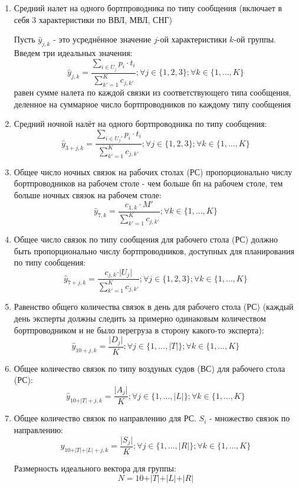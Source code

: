 \documentclass[%
10pt, %
final, %
oneside, %
onecolumn, %
centertags]{article} %
\theoremstyle{plain}
\theoremstyle{definition}
\theoremstyle{remark}
\begin{document}
\begin{enumerate}
	\item Средний налет на одного бортпроводника по типу сообщения (включает в себя $3$ характеристики по ВВЛ, МВЛ, СНГ)

	Пусть $\hat{y}_{j,k}$ - это усреднённое значение $j$-ой характеристики $k$-ой группы. Введем три идеальных значения:
	$$\hat{y}_{j,k} = \frac{\sum\limits_{i \in U_j} p_i \cdot t_i}{\sum\limits_{k'=1}^K c_{j,k'}}; \forall j \in \{1,2,3\}; \forall k \in \{1,\ldots,K\}$$
	равен сумме налета по каждой связки из соответствующего типа сообщения, деленное на суммарное число бортпроводников по каждому типу сообщения 
	\item Средний ночной налёт на одного бортпроводника по типу сообщения:
	$$\hat{y}_{3+j,k} = \frac{\sum\limits_{i \in U_j'} p_i \cdot t_i}{\sum\limits_{k'=1}^K c_{j,k'}}; \forall j \in \{1,2,3\}; \forall k \in \{1,\ldots,K\}$$
	\item Общее число ночных связок на рабочих столах (РС) пропорционально числу бортпроводников на рабочем столе - чем больше бп на рабочем столе, тем больше ночных связок на рабочем столе:
	$$\hat{y}_{7,k} = \frac{c_{1,k}\cdot M'}{\sum\limits_{k'=1}^K c_{j,k'}}; \forall k \in\{1,\ldots,K\}$$
	\item Общее число связок по типу сообщения для рабочего стола (РС) должно быть пропорционально числу бортпроводников, доступных для планирования по типу сообщения:
	$$\hat{y}_{7+j,k} = \frac{c_{j,k}\cdot \vert U_j\vert}{\sum\limits_{k'=1}^K c_{j,k'}}; \forall j \in \{1,2,3\};\forall k \in\{1,\ldots,K\}$$
	\item Равенство общего количества связок в день для рабочего стола (РС) (каждый день эксперты должны следить за примерно одинаковым количеством бортпроводником и не было перегруза в сторону какого-то эксперта):
	$$\hat{y}_{10+j,k} = \frac{\vert D_j \vert}{K}; \forall j \in \{1,\ldots,\vert T \vert\};\forall k \in\{1,\ldots,K\}$$
	\item Общее количество связок по типу воздуных судов (ВС) для рабочего стола (РС):
	$$\hat{y}_{10+\vert T \vert + j, k} = \frac{\vert A_j \vert}{K}; \forall j \in \{1,\ldots,\vert L \vert\}; \forall k \in \{1,\ldots,K\}$$
	\item Общее количество связок по направлению для РС. $S_i$ - множество связок по направлению:
	$$\hat{y}_{10+\vert T \vert + \vert L \vert + j, k} = \frac{\vert S_j \vert}{K}; \forall j \in \{1,\ldots,\vert R \vert\}; \forall k \in \{1,\ldots,K\}$$

	Размерность идеального вектора для группы:
	$$N = 10 + \vert T \vert + \vert L  \vert+ \vert R \vert$$
\end{enumerate}
\end{document}

